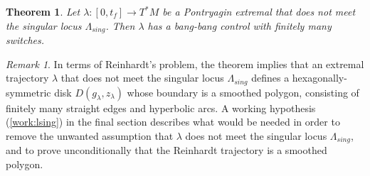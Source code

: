 \documentclass{article}
\newtheorem{theorem}{Theorem}[subsection]
\theoremstyle{remark}
\newtheorem{remark}[equation]{Remark}%
\newcommand\Lsing{\Lambda_{sing}}
\begin{document}
\begin{theorem}\label{thm:finite}
  Let $\lambda:[0,t_f]\to T^*M$ be a Pontryagin extremal that does not
  meet the singular locus $\Lsing$.  Then $\lambda$ has a bang-bang
  control with finitely many switches.
\end{theorem}


\begin{remark} In terms of Reinhardt's problem, the theorem implies
  that an extremal trajectory $\lambda$ that does not meet the
  singular locus $\Lsing$ defines a hexagonally-symmetric disk
  $D(g_\lambda,z_\lambda)$ whose boundary is a smoothed polygon,
  consisting of finitely many straight edges and hyperbolic arcs.  A
  working hypothesis (\ref{work:lsing}) in the final section describes
  what would be needed in order to remove the unwanted assumption
  that $\lambda$ does not meet the singular locus $\Lsing$, and
  to prove unconditionally that the Reinhardt trajectory is a smoothed polygon.
\end{remark}
\end{document}
